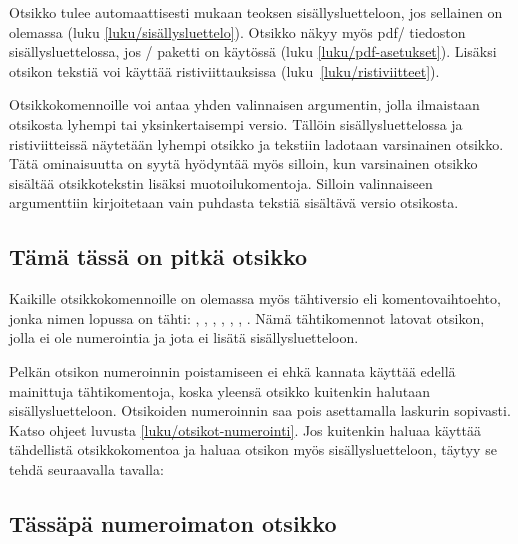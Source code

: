 \noindent
Otsikko tulee automaattisesti mukaan teoksen sisällysluetteloon, jos
sellainen on olemassa (luku \ref{luku/sisällysluettelo}). Otsikko näkyy
myös pdf\-/ tiedoston sisällysluettelossa, jos \-/
paketti on käytössä (luku \ref{luku/pdf-asetukset}). Lisäksi otsikon
tekstiä voi käyttää ristiviittauksissa (luku~\ref{luku/ristiviitteet}).

Otsikkokomennoille voi antaa yhden valinnaisen argumentin, jolla
ilmaistaan otsikosta lyhempi tai yksinkertaisempi versio. Tällöin
sisällysluettelossa ja ristiviitteissä näytetään lyhempi otsikko ja
tekstiin ladotaan varsinainen otsikko. Tätä ominaisuutta on syytä
hyödyntää myös silloin, kun varsinainen otsikko sisältää otsikkotekstin
lisäksi muotoilukomentoja. Silloin valinnaiseen argumenttiin
kirjoitetaan vain puhdasta tekstiä sisältävä versio otsikosta.

\begin{koodilohkosis}
\section[Lyhyt otsikko]{Tämä tässä on pitkä otsikko}
\end{koodilohkosis}

\noindent
Kaikille otsikkokomennoille on olemassa myös tähtiversio eli
komentovaihtoehto, jonka nimen lopussa on tähti: ,
, , ,
, , .
Nämä tähtikomennot latovat otsikon, jolla ei ole numerointia ja jota ei
lisätä sisällysluetteloon.

Pelkän otsikon numeroinnin poistamiseen ei ehkä kannata käyttää edellä
mainittuja tähtikomentoja, koska yleensä otsikko kuitenkin halutaan
sisällysluetteloon. Otsikoiden numeroinnin saa pois asettamalla laskurin
 sopivasti. Katso ohjeet luvusta
\ref{luku/otsikot-numerointi}. Jos kuitenkin haluaa käyttää tähdellistä
otsikkokomentoa ja haluaa otsikon myös sisällysluetteloon, täytyy se
tehdä seuraavalla tavalla:

\begin{koodilohkosis}
\section*{Tässäpä numeroimaton otsikko}
{}
\end{koodilohkosis}

